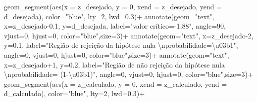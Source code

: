 \documentclass[
]{book}
\newenvironment{Shaded}{\begin{snugshade}}{\end{snugshade}}
\newcommand{\AttributeTok}[1]{\textcolor[rgb]{0.77,0.63,0.00}{#1}}
\newcommand{\DecValTok}[1]{\textcolor[rgb]{0.00,0.00,0.81}{#1}}
\newcommand{\FloatTok}[1]{\textcolor[rgb]{0.00,0.00,0.81}{#1}}
\newcommand{\FunctionTok}[1]{\textcolor[rgb]{0.00,0.00,0.00}{#1}}
\newcommand{\NormalTok}[1]{#1}
\newcommand{\SpecialCharTok}[1]{\textcolor[rgb]{0.00,0.00,0.00}{#1}}
\newcommand{\StringTok}[1]{\textcolor[rgb]{0.31,0.60,0.02}{#1}}
\begin{document}
\begin{Shaded}
\begin{Highlighting}[]
\FunctionTok{geom\_segment}\NormalTok{(}\FunctionTok{aes}\NormalTok{(}\AttributeTok{x =}\NormalTok{ z\_desejado, }\AttributeTok{y =} \DecValTok{0}\NormalTok{, }\AttributeTok{xend =}\NormalTok{ z\_desejado, }\AttributeTok{yend =}\NormalTok{ d\_desejada), }\AttributeTok{color=}\StringTok{"blue"}\NormalTok{, }\AttributeTok{lty=}\DecValTok{2}\NormalTok{, }\AttributeTok{lwd=}\FloatTok{0.3}\NormalTok{)}\SpecialCharTok{+}
\FunctionTok{annotate}\NormalTok{(}\AttributeTok{geom=}\StringTok{"text"}\NormalTok{, }\AttributeTok{x=}\NormalTok{z\_desejado}\FloatTok{{-}0.1}\NormalTok{, }\AttributeTok{y=}\NormalTok{d\_desejada, }\AttributeTok{label=}\StringTok{"valor crítico={-}1,88"}\NormalTok{, }\AttributeTok{angle=}\DecValTok{90}\NormalTok{, }\AttributeTok{vjust=}\DecValTok{0}\NormalTok{, }\AttributeTok{hjust=}\DecValTok{0}\NormalTok{, }\AttributeTok{color=}\StringTok{"blue"}\NormalTok{,}\AttributeTok{size=}\DecValTok{3}\NormalTok{)}\SpecialCharTok{+}
\FunctionTok{annotate}\NormalTok{(}\AttributeTok{geom=}\StringTok{"text"}\NormalTok{, }\AttributeTok{x=}\NormalTok{z\_desejado}\DecValTok{{-}2}\NormalTok{, }\AttributeTok{y=}\FloatTok{0.1}\NormalTok{, }\AttributeTok{label=}\StringTok{"Região de rejeição da hipótese nula }\SpecialCharTok{\textbackslash{}n}\StringTok{probabilidade=\textbackslash{}u03b1"}\NormalTok{, }\AttributeTok{angle=}\DecValTok{0}\NormalTok{, }\AttributeTok{vjust=}\DecValTok{0}\NormalTok{, }\AttributeTok{hjust=}\DecValTok{0}\NormalTok{, }\AttributeTok{color=}\StringTok{"blue"}\NormalTok{,}\AttributeTok{size=}\DecValTok{3}\NormalTok{)}\SpecialCharTok{+}
\FunctionTok{annotate}\NormalTok{(}\AttributeTok{geom=}\StringTok{"text"}\NormalTok{, }\AttributeTok{x=}\NormalTok{z\_desejado}\SpecialCharTok{+}\DecValTok{1}\NormalTok{, }\AttributeTok{y=}\FloatTok{0.2}\NormalTok{, }\AttributeTok{label=}\StringTok{"Região de não rejeição da hipótese nula  }\SpecialCharTok{\textbackslash{}n}\StringTok{probabilidade= (1{-}\textbackslash{}u03b1)"}\NormalTok{, }\AttributeTok{angle=}\DecValTok{0}\NormalTok{, }\AttributeTok{vjust=}\DecValTok{0}\NormalTok{, }\AttributeTok{hjust=}\DecValTok{0}\NormalTok{, }\AttributeTok{color=}\StringTok{"blue"}\NormalTok{,}\AttributeTok{size=}\DecValTok{3}\NormalTok{)}\SpecialCharTok{+}
  \FunctionTok{geom\_segment}\NormalTok{(}\FunctionTok{aes}\NormalTok{(}\AttributeTok{x =}\NormalTok{ z\_calculado, }\AttributeTok{y =} \DecValTok{0}\NormalTok{, }\AttributeTok{xend =}\NormalTok{ z\_calculado, }\AttributeTok{yend =}\NormalTok{ d\_calculado), }\AttributeTok{color=}\StringTok{"blue"}\NormalTok{, }\AttributeTok{lty=}\DecValTok{2}\NormalTok{, }\AttributeTok{lwd=}\FloatTok{0.3}\NormalTok{)}\SpecialCharTok{+}

\end{Highlighting}
\end{Shaded}
\end{document}

